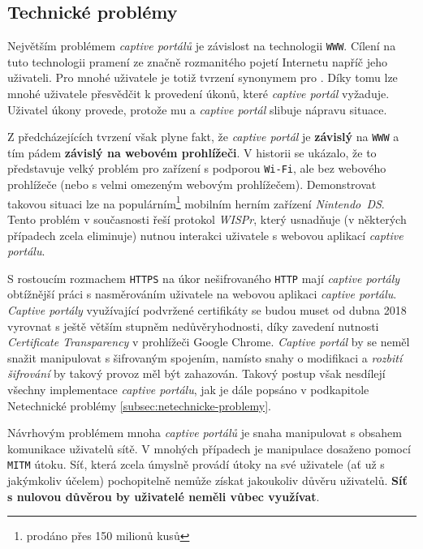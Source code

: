 \documentclass[thesis=M,czech]{FITthesis}[2012/10/20]
\begin{document}
\subsection{Technické problémy}

Největším problémem \textit{captive portálů} je závislost na technologii \texttt{WWW}. Cílení na tuto technologii pramení ze značně rozmanitého pojetí Internetu napříč jeho uživateli. Pro mnohé uživatele je totiž tvrzení  synonymem pro . Díky tomu lze mnohé uživatele přesvědčit k provedení úkonů, které \textit{captive portál} vyžaduje. Uživatel úkony provede, protože mu  a \textit{captive portál} slibuje nápravu situace.

Z předcházejících tvrzení však plyne fakt, že \textit{captive portál} je \textbf{závislý} na \texttt{WWW} a tím pádem \textbf{závislý na webovém prohlížeči}. V historii se ukázalo, že to představuje velký problém pro zařízení s podporou \texttt{Wi-Fi}, ale bez webového prohlížeče (nebo s velmi omezeným webovým prohlížečem). Demonstrovat takovou situaci lze na populárním\footnote{prodáno přes 150 milionů kusů\cite{nintendo-sales}} mobilním herním zařízení \textit{Nintendo~DS}. Tento problém v současnosti řeší protokol \textit{WISPr}\cite{wispr-specs}, který usnadňuje (v některých případech zcela eliminuje) nutnou interakci uživatele s webovou aplikací \textit{captive portálu}.

S rostoucím rozmachem \texttt{HTTPS} na úkor nešifrovaného \texttt{HTTP} mají \textit{captive portály} obtížnější práci s nasměrováním uživatele na webovou aplikaci \textit{captive portálu}. \textit{Captive portály} využívající podvržené certifikáty se budou muset od dubna 2018 vyrovnat s ještě větším stupněm nedůvěryhodnosti, díky zavedení nutnosti \textit{Certificate Transparency} v prohlížeči Google Chrome\cite{google-mandatory-cert-transp}. \textit{Captive portál} by se neměl snažit manipulovat s šifrovaným spojením, namísto snahy o modifikaci a \textit{rozbití šifrování} by takový provoz měl být zahazován. Takový postup však nesdílejí všechny implementace \textit{captive portálu}, jak je dále popsáno v podkapitole Netechnické problémy \ref{subsec:netechnicke-problemy}.

Návrhovým problémem mnoha \textit{captive portálů} je snaha manipulovat s obsahem komunikace uživatelů sítě. V mnohých případech je manipulace dosaženo pomocí \texttt{MITM} útoku. Síť, která zcela úmyslně provádí útoky na své uživatele (ať už s jakýmkoliv účelem) pochopitelně nemůže získat jakoukoliv důvěru uživatelů. \textbf{Síť s nulovou důvěrou by uživatelé neměli vůbec využívat}.
\end{document}
